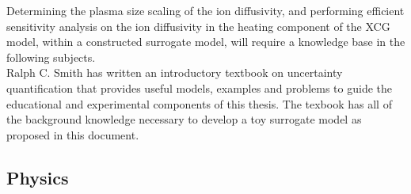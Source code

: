 \documentclass{article}
\begin{document}
Determining the plasma size scaling of the ion diffusivity, and performing efficient sensitivity analysis on the ion diffusivity in the heating component of the XCG model, within a constructed surrogate model, will require a knowledge base in the following subjects.\\  

Ralph C. Smith has written an introductory textbook on uncertainty quantification that provides useful models, examples and problems to guide the educational and experimental components of this thesis. The texbook has all of the background knowledge necessary to develop a toy surrogate model as proposed in this document.\\  

\subsection*{Physics}
\end{document}
